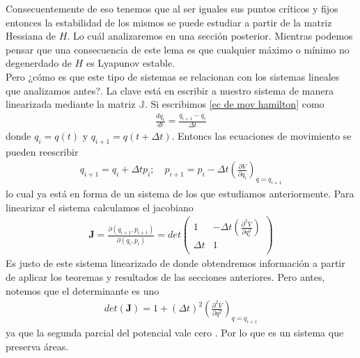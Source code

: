 Consecuentemente de eso tenemos que al ser iguales sus puntos críticos y fijos entonces la estabilidad de los mismos se puede estudiar a partir de la matriz Hessiana de $H$. Lo cuál analizaremos en una sección posterior. Mientras podemos pensar que una consecuencia de este lema es que cualquier máximo o mínimo no degenerdado de $H$ es Lyapunov estable. \\
Pero ¿cómo es que este tipo de sistemas se relacionan con los sistemas lineales que analizamos antes?. La clave está en escribir a nuestro sistema de manera linearizada mediante la matriz $\mathbb{J}$. Si escribimos \ref{ec de mov hamilton} como
\begin{eqnarray*}
\frac{dq_{i}}{dt}=\frac{q_{i+1}-q_{i}}{\Delta t}
\end{eqnarray*}
donde $q_{i}=q(t)$ y $q_{i+1}=q(t+\Delta t)$. Entoncs las ecuaciones de movimiento se pueden reescribir 
\begin{eqnarray}
q_{i+1}=q_{i}+\Delta t p_{i} ;\quad p_{i+1}=p_{i}-\Delta t\left( \frac{\partial V}{\partial q_{i} } \right)_{q=q_{i+1}} \label{hamilton sistema dinamico}
\end{eqnarray}
lo cual ya está en forma de un sistema de los que estudiamos anteriormente. Para linearizar el sistema calculamos el jacobiano
\begin{eqnarray}
\mathbf{J}=\frac{\partial(q_{i+1},p_{i+1})}{\partial(q_{i},p_{i})}=
det \begin{pmatrix} 
1 & -\Delta t \left( \frac{\partial^{2} V}{\partial q_{i}^{2} } \right)\\
\Delta t & 1 \\
\end{pmatrix}
\end{eqnarray}
Es justo de este sistema linearizado de donde obtendremos información a partir de aplicar los teoremas y resultados de las secciones anteriores. Pero antes, notemos que el determinante es uno
\begin{eqnarray*}
det(\mathbf{J})=1+(\Delta t)^{2}\left( \frac{\partial^{2} V}{\partial q^{2} } \right)_{q=q_{i+1}}
\end{eqnarray*}
 ya que la segunda parcial del potencial vale cero . Por lo que es un sistema que preserva áreas.









